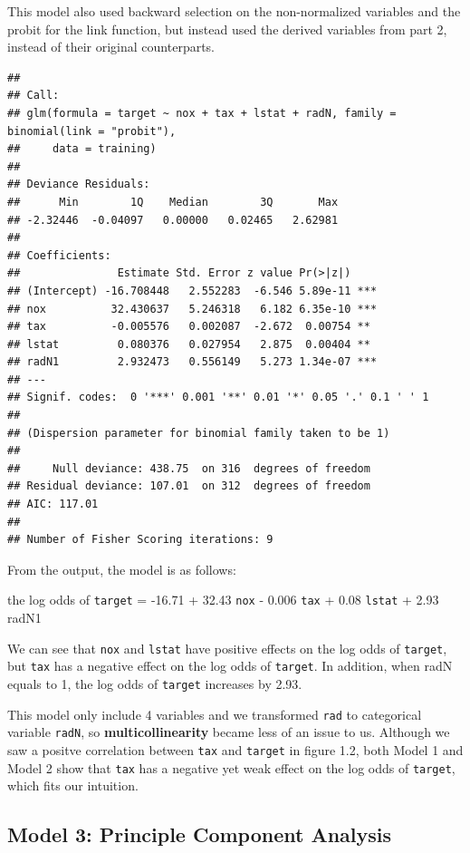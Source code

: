 \documentclass[]{article}
\begin{document}
This model also used backward selection on the non-normalized variables
and the probit for the link function, but instead used the derived
variables from part 2, instead of their original counterparts.

\begin{verbatim}
## 
## Call:
## glm(formula = target ~ nox + tax + lstat + radN, family = binomial(link = "probit"), 
##     data = training)
## 
## Deviance Residuals: 
##      Min        1Q    Median        3Q       Max  
## -2.32446  -0.04097   0.00000   0.02465   2.62981  
## 
## Coefficients:
##               Estimate Std. Error z value Pr(>|z|)    
## (Intercept) -16.708448   2.552283  -6.546 5.89e-11 ***
## nox          32.430637   5.246318   6.182 6.35e-10 ***
## tax          -0.005576   0.002087  -2.672  0.00754 ** 
## lstat         0.080376   0.027954   2.875  0.00404 ** 
## radN1         2.932473   0.556149   5.273 1.34e-07 ***
## ---
## Signif. codes:  0 '***' 0.001 '**' 0.01 '*' 0.05 '.' 0.1 ' ' 1
## 
## (Dispersion parameter for binomial family taken to be 1)
## 
##     Null deviance: 438.75  on 316  degrees of freedom
## Residual deviance: 107.01  on 312  degrees of freedom
## AIC: 117.01
## 
## Number of Fisher Scoring iterations: 9
\end{verbatim}

From the output, the model is as follows:

the log odds of \texttt{target} = -16.71 + 32.43 \texttt{nox} - 0.006
\texttt{tax} + 0.08 \texttt{lstat} + 2.93 radN1

We can see that \texttt{nox} and \texttt{lstat} have positive effects on
the log odds of \texttt{target}, but \texttt{tax} has a negative effect
on the log odds of \texttt{target}. In addition, when radN equals to 1,
the log odds of \texttt{target} increases by 2.93.

This model only include 4 variables and we transformed \texttt{rad} to
categorical variable \texttt{radN}, so \textbf{multicollinearity} became
less of an issue to us. Although we saw a positve correlation between
\texttt{tax} and \texttt{target} in figure 1.2, both Model 1 and Model 2
show that \texttt{tax} has a negative yet weak effect on the log odds of
\texttt{target}, which fits our intuition.

\subsection{Model 3: Principle Component
Analysis}\label{model-3-principle-component-analysis}
\end{document}
